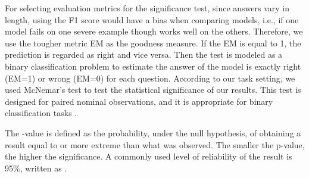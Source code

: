\documentclass[letterpaper]{article} \usepackage{aaai21}  \usepackage{times}  \usepackage{helvet} \usepackage{courier}  \usepackage[hyphens]{url}  \usepackage{graphicx}
\begin{document}
For selecting evaluation metrics for the significance test, since answers vary in length, using the F1 score would have a bias when comparing models, i.e., if one model fails on one severe example though works well on the others. Therefore, we use the tougher metric EM as the goodness measure. If the EM is equal to 1, the prediction is regarded as right and vice versa. Then the test is modeled as a binary classification problem to estimate the answer of the model is exactly right (EM=1) or wrong (EM=0) for each question. According to our task setting, we used McNemar’s test \cite{mcnemar1947note} to test the statistical significance of our results. This test is designed for paired nominal observations, and it is appropriate for binary classification tasks \cite{ziser2016neural}. 






The -value is defined as the probability, under the null hypothesis, of obtaining a result equal to or more extreme than what was observed. The smaller the p-value, the higher the significance. A commonly used level of reliability of the result is 95\%, written as .
\end{document}
